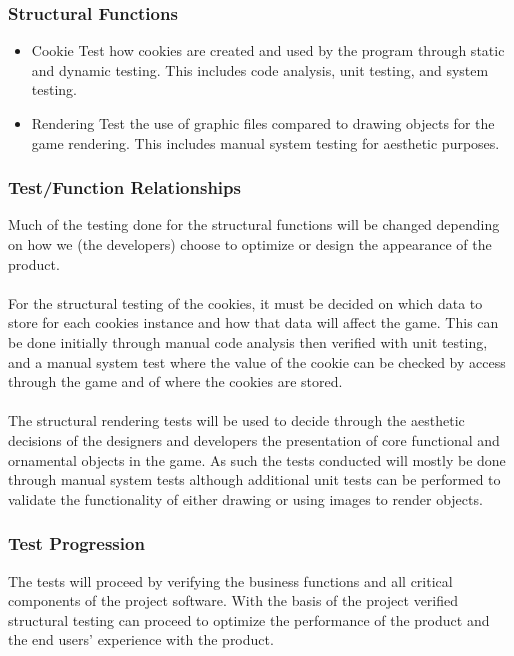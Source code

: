 \documentclass[11pt, oneside]{article}   	%
\begin{document}
\subsubsection*{Structural Functions}
\begin{itemize}
\item Cookie
\subitem Test how cookies are created and used by the program through static and dynamic testing. This includes code analysis, unit testing, and system testing.

\item Rendering
\subitem Test the use of graphic files compared to drawing objects for the game rendering. This includes manual system testing for aesthetic purposes. 
\end{itemize}

\subsubsection*{Test/Function Relationships}
Much of the testing done for the structural functions will be changed depending on how we (the developers) choose to optimize or design the appearance of the product.\\
\\
For the structural testing of the cookies, it must be decided on which data to store for each cookies instance and how that data will affect the game. This can be done initially through manual code analysis then verified with unit testing, and a manual system test where the value of the cookie can be checked by access through the game and of where the cookies are stored.\\
\\
The structural rendering tests will be used to decide through the aesthetic decisions of the designers and developers the presentation of core functional and ornamental objects in the game. As such the tests conducted will mostly be done through manual system tests although additional unit tests can be performed to validate the functionality of either drawing or using images to render objects.

\subsubsection*{Test Progression}
The tests will proceed by verifying the business functions and all critical components of the project software. With the basis of the project verified structural testing can proceed to optimize the performance of the product and the end users' experience with the product.
\end{document}
